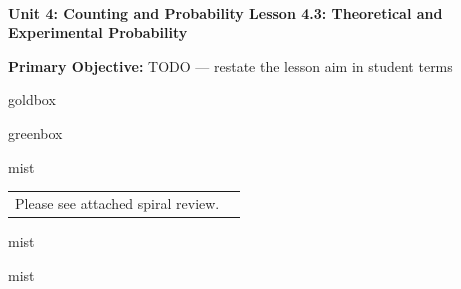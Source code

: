 \documentclass[10pt]{article}
\newcommand{\UnitNumberName}{Unit 4: Counting and Probability \quad}
\newcommand{\LessonNumberName}{Lesson 4.3: Theoretical and Experimental Probability}
\begin{document}
\begin{center}
    {\Large\bfseries \CourseName \\
    {\small\bfseries \UnitNumberName \LessonNumberName}}
\end{center}

\begin{tcolorbox}[colback=mist, colframe=royal, boxrule=0.9pt, arc=2mm,
    left=2mm, right=2mm, top=1.5mm, bottom=1.5mm]
    \textbf{Primary Objective:} TODO --- restate the lesson aim in student terms
\end{tcolorbox}

\renewcommand{\arraystretch}{1.6}
\begin{skillbox}{goldbox}
\end{skillbox}

\begin{skillbox}{greenbox}
\end{skillbox}

\begin{fixedskillbox}{mist}
    \begin{tabularx}{\linewidth}{@{}X c@{}}
        \begin{minipage}[t]{0.55\linewidth}\vspace{0pt}
            Please see attached spiral review.  %
        \end{minipage}
        &
        \begin{minipage}[t]{0.38\linewidth}\vspace{0pt}\centering
        \end{minipage}
    \end{tabularx}
\end{fixedskillbox}

\begin{skillbox}[Hook]{mist}
\end{skillbox}

\begin{skillbox}[Lesson]{mist}
\end{skillbox}
\end{document}
